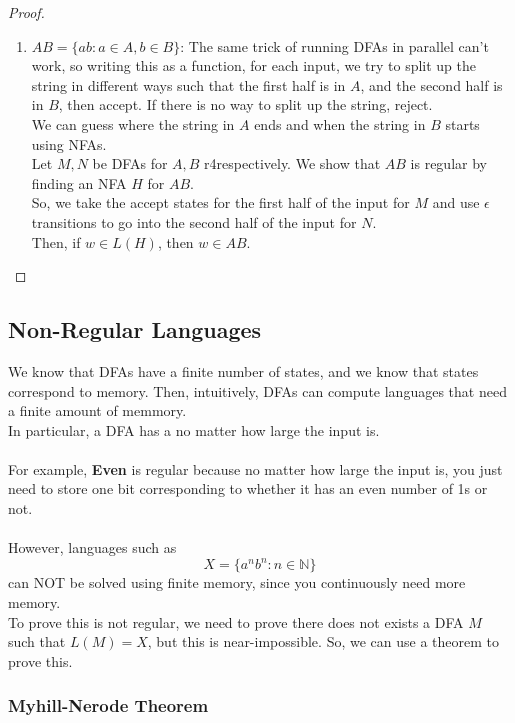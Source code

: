 \documentclass{article}
\begin{document}
\begin{proof}
\begin{enumerate}
         \item $AB = \{ab: a \in A, b \in B\}$: The same trick of running DFAs in parallel can't work, so writing this as a function, for each input, we try to split up the string in different ways such that the first half is in $A$, and the second half is in $B$, then accept. If there is no way to split up the string, reject.\\
         We can guess where the string in $A$ ends and when the string in $B$ starts using NFAs.\\
         Let $M,N$ be DFAs for $A,B$ r4respectively. We show that $AB$ is regular by finding an NFA $H$ for $AB$.\\
         So, we take the accept states for the first half of the input for $M$ and use $\epsilon$ transitions to go into the second half of the input for $N$.\\
         Then, if $w \in L(H)$, then $w \in AB$.
    \end{enumerate}
    \end{proof}
    
    \subsection{Non-Regular Languages}
    We know that DFAs have a finite number of states, and we know that states correspond to memory. Then, intuitively, DFAs can compute languages that need a finite amount of memmory.\\
    In particular, a DFA has a  no matter how large the input is.\\
    \\
    For example, \textbf{Even} is regular because no matter how large the input is, you just need to store one bit corresponding to whether it has an even number of 1s or not.\\
    \\
    However, languages such as
    $$X = \{a^nb^n : n \in \mathbb{N}\}$$ 
    can NOT be solved using finite memory, since you continuously need more memory.\\
    To prove this is not regular, we need to prove there does not exists a DFA $M$ such that $L(M) = X$, but this is near-impossible. So, we can use a theorem to prove this.
    
    \subsubsection{Myhill-Nerode Theorem}
\end{document}
